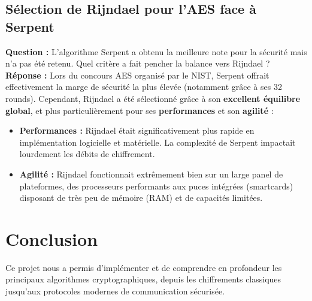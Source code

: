 \documentclass[12pt,a4paper]{report}
\begin{document}
\section{Sélection de Rijndael pour l'AES face à Serpent}
\textbf{Question :} L’algorithme Serpent a obtenu la meilleure note pour la sécurité mais n'a pas été retenu. Quel critère a fait pencher la balance vers Rijndael ?\\
\textbf{Réponse :}
Lors du concours AES organisé par le NIST, Serpent offrait effectivement la marge de sécurité la plus élevée (notamment grâce à ses 32 rounds). Cependant, Rijndael a été sélectionné grâce à son \textbf{excellent équilibre global}, et plus particulièrement pour ses \textbf{performances} et son \textbf{agilité} :
\begin{itemize}
    \item \textbf{Performances :} Rijndael était significativement plus rapide en implémentation logicielle et matérielle. La complexité de Serpent impactait lourdement les débits de chiffrement.
    \item \textbf{Agilité :} Rijndael fonctionnait extrêmement bien sur un large panel de plateformes, des processeurs performants aux puces intégrées (smartcards) disposant de très peu de mémoire (RAM) et de capacités limitées.
\end{itemize}

\chapter{Conclusion}

Ce projet nous a permis d'implémenter et de comprendre en profondeur les principaux algorithmes cryptographiques, depuis les chiffrements classiques jusqu'aux protocoles modernes de communication sécurisée.
\end{document}
